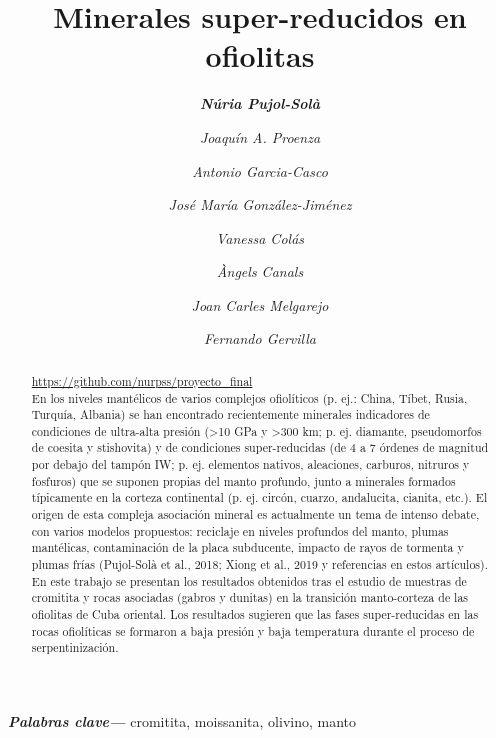 \documentclass[a4paper,11pt]{article}
\providecommand{\keywords}[1]{\textbf{\textit{Palabras clave---}} #1}
\begin{document}
	\title {\bf Minerales super-reducidos en ofiolitas}
	\author[1]{\sl \bf Núria Pujol-Solà}
	\author[1]{\sl Joaquín A. Proenza}
	\author[2,3]{\sl Antonio Garcia-Casco}
	\author[2]{\sl José María González-Jiménez}
	\author[4]{\sl Vanessa Colás}
	\author[1]{\sl Àngels Canals}
	\author[1]{\sl Joan Carles Melgarejo}
	\author[2,3]{\sl Fernando Gervilla} 
	\renewcommand\Authands{ y }
	\date{}
	\maketitle
	
	\begin{abstract}
	\href{https://github.com/nurpss/proyecto_final}{https://github.com/nurpss/proyecto\_final}
	\\En los niveles mantélicos de varios complejos ofiolíticos (p. ej.: China, Tíbet, Rusia, Turquía, Albania) se han encontrado recientemente minerales indicadores de condiciones de ultra-alta presión (>10 GPa y >300 km; p. ej. diamante, pseudomorfos de coesita y stishovita) y de condiciones super-reducidas (de 4 a 7 órdenes de magnitud por debajo del tampón IW; p. ej. elementos nativos, aleaciones, carburos, nitruros y fosfuros) que se suponen propias del manto profundo, junto a minerales formados típicamente en la corteza continental (p. ej. circón, cuarzo, andalucita, cianita, etc.). El origen de esta compleja asociación mineral es actualmente un tema de intenso debate, con varios modelos propuestos: reciclaje en niveles profundos del manto, plumas mantélicas, contaminación de la placa subducente, impacto de rayos de tormenta y plumas frías (Pujol-Solà et al., 2018; Xiong et al., 2019 y referencias en estos artículos). 
	En este trabajo se presentan los resultados obtenidos tras el estudio de muestras de cromitita y rocas asociadas (gabros y dunitas) en la transición manto-corteza de las ofiolitas de Cuba oriental. Los resultados sugieren que las fases super-reducidas en las rocas ofiolíticas se formaron a baja presión y baja temperatura durante el proceso de serpentinización.
	\end{abstract}
	\keywords{cromitita, moissanita, olivino, manto}
	
\end{document}
